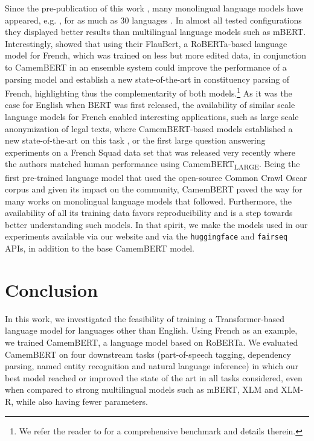 \documentclass[11pt,a4paper]{article}
\newcommand{\camembert}{CamemBERT\xspace}
\newcommand{\camembertlarge}{CamemBERT\textsubscript{LARGE}\xspace}
\newcommand{\roberta}{RoBERTa\xspace}
\newcommand{\bert}{BERT\xspace}
\newcommand{\mbert}{mBERT\xspace}
\begin{document}
Since the pre-publication of this work \cite{martinetal2019Camembert},
many monolingual language models have appeared, e.g. 
\cite{le_at_al2019flaubert,FinBert2019,RobBERT2020}, for as much as 30
languages \cite{horvyteam:2020:arxiv}. In almost all tested
configurations they displayed better results than multilingual
language models such as \mbert \cite{pires_et_al2019multilingual}. 
Interestingly,  showed that using their
FlauBert, a RoBERTa-based language model for French, which was trained on less
but more edited data, in conjunction to \camembert in an ensemble
system could improve the performance of a parsing model and  establish
a new state-of-the-art in constituency parsing of French, highlighting thus
the complementarity of both models.\footnote{We refer the reader to
\cite{le_at_al2019flaubert} for a comprehensive benchmark and details
therein.}
As it was the case for English when \bert was first released, the
availability of similar scale language models for French enabled
interesting applications, such as large scale anonymization of legal
texts, where \camembert-based models established a new
state-of-the-art on this task \cite{bennesty:2019:anonym}, or the first
large question answering experiments on a French Squad data set that
was released very recently \cite{fquad:2020:arXiv} where the authors matched human performance using \camembertlarge.
Being the first pre-trained language model that used the open-source Common Crawl Oscar
corpus and given its impact on the community, 
\camembert paved the way for many works on monolingual language
models that followed. Furthermore, the availability of all its
training data favors reproducibility and is a step towards better
understanding such models.
In that spirit, we make the models used in our experiments available via our website and via the {\tt huggingface} and {\tt fairseq} APIs, in addition to the base \camembert model.

\section{Conclusion}
In this work, we investigated the feasibility of training a
Transformer-based language model for languages other than English.
Using French as an example, we trained \camembert, a language model
based on \roberta.  
We evaluated \camembert on four downstream tasks 
(part-of-speech tagging, dependency parsing, named entity recognition
and natural language inference) in which our best model reached or improved the state of the art in all tasks
considered, even when compared to strong multilingual models such as
\mbert, XLM and XLM-R, while also having fewer parameters.  
\end{document}
